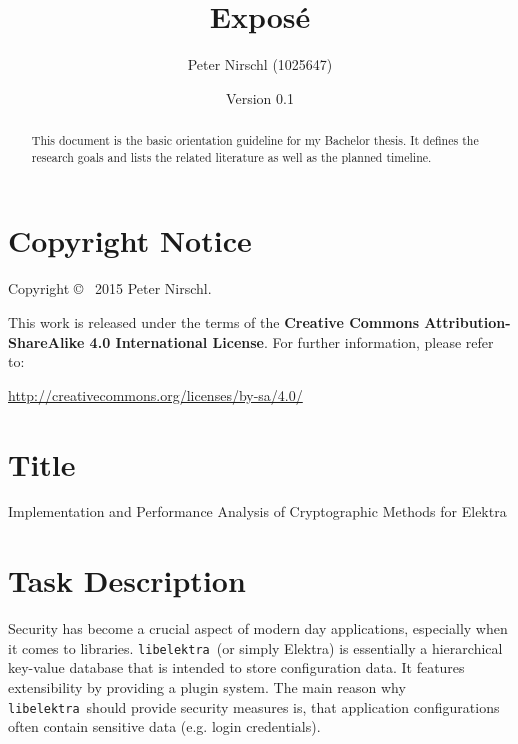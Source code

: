\documentclass[a4paper,12pt]{article}
\title{Exposé}
\author{Peter Nirschl (1025647)}
\date{Version 0.1}
\newcommand{\libelektra}{\texttt{libelektra}~}
\begin{document}
\maketitle
\begin{abstract}
This document is the basic orientation guideline for my Bachelor thesis.
It defines the research goals and lists the related literature as well as the planned timeline.
\end{abstract}

\vfill

\section*{Copyright Notice}

Copyright \copyright~ 2015 Peter Nirschl.

This work is released under the terms of the \textbf{Creative Commons Attribution-ShareAlike 4.0 International License}.
For further information, please refer to:

\url{http://creativecommons.org/licenses/by-sa/4.0/}

\newpage

\section{Title}

Implementation and Performance Analysis of Cryptographic Methods for Elektra


\section{Task Description}

Security has become a crucial aspect of modern day applications, especially when it comes to libraries.
\libelektra (or simply Elektra) is essentially a hierarchical key-value database that is intended to store configuration data. It features extensibility by providing a plugin system. The main reason why \libelektra should provide security measures is, that application configurations often contain sensitive data (e.g. login credentials).
\end{document}

